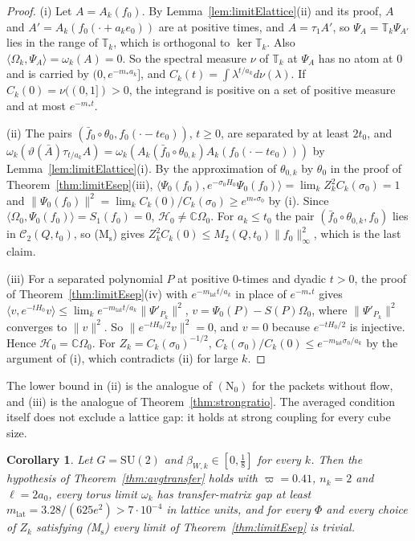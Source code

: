 \documentclass[aps,prd,twocolumn,superscriptaddress,nofootinbib,longbibliography,floatfix,amsmath,amssymb,10pt]{revtex4-2}
\newtheorem{corollary}[theorem]{Corollary}
\theoremstyle{definition}
\theoremstyle{remark}
\newcommand{\C}{\mathbb{C}}
\newcommand{\SU}{\mathrm{SU}}
\newcommand{\ip}[2]{\langle #1,#2\rangle}
\begin{document}
\begin{proof}
(i) Let $A=A_k(f_0)$. By Lemma~\ref{lem:limitElattice}(ii) and its proof,
$A$ and $A'=A_k(f_0(\cdot+a_ke_0))$ are at positive times, and $A=\tau_1A'$,
so $\Psi_A=\mathbb T_k\Psi_{A'}$ lies in the range of $\mathbb T_k$, which is
orthogonal to $\ker\mathbb T_k$. Also $\ip{\Omega_k}{\Psi_A}=\omega_k(A)=0$.
So the spectral measure $\nu$ of $\mathbb T_k$ at $\Psi_A$ has no atom at
$0$ and is carried by $(0,e^{-m_*a_k}]$, and $C_k(t)=\int\lambda^{t/a_k}
d\nu(\lambda)$. If $C_k(0)=\nu((0,1])>0$, the integrand is positive on a
set of positive measure and at most $e^{-m_*t}$.

(ii) The pairs $(\bar f_0\circ\theta_0,f_0(\cdot-te_0))$, $t\ge0$, are
separated by at least $2t_0$, and $\omega_k(\vartheta(\bar A)\tau_{t/a_k}
A)=\omega_k(A_k(\bar f_0\circ\theta_{0,k})A_k(f_0(\cdot-te_0)))$ by
Lemma~\ref{lem:limitElattice}(i). By the approximation of $\theta_{0,k}$ by
$\theta_0$ in the proof of Theorem~\ref{thm:limitEsep}(iii),
$\ip{\Psi_0(f_0)}{e^{-\sigma_0H_0}\Psi_0(f_0)}=\lim_kZ_k^2C_k(\sigma_0)=1$
and $\|\Psi_0(f_0)\|^2=\lim_kC_k(0)/C_k(\sigma_0)\ge e^{m_*\sigma_0}$ by (i).
Since $\ip{\Omega_0}{\Psi_0(f_0)}=S_1(f_0)=0$, $\mathcal H_0\ne\C\Omega_0$.
For $a_k\le t_0$ the pair $(\bar f_0\circ\theta_{0,k},f_0)$ lies in
$\mathcal C_2(Q,t_0)$, so (M$_{\mathrm s}$) gives $Z_k^2C_k(0)\le M_2(Q,t_0)
\|f_0\|_\infty^2$, which is the last claim.

(iii) For a separated polynomial $P$ at positive $0$-times and dyadic $t>0$,
the proof of Theorem~\ref{thm:limitEsep}(iv) with $e^{-m_{\mathrm{lat}}t/a_k}$ in place
of $e^{-m_*t}$ gives $\ip v{e^{-tH_0}v}\le\lim_ke^{-m_{\mathrm{lat}}t/a_k}\|\Psi'_{P_k}
\|^2$, $v=\Psi_0(P)-S(P)\Omega_0$, where $\|\Psi'_{P_k}\|^2$ converges to
$\|v\|^2$. So $\|e^{-tH_0/2}v\|^2=0$, and $v=0$ because $e^{-tH_0/2}$ is
injective. Hence $\mathcal H_0=\C\Omega_0$. For $Z_k=C_k(\sigma_0)^{-1/2}$,
$C_k(\sigma_0)/C_k(0)\le e^{-m_{\mathrm{lat}}\sigma_0/a_k}$ by the argument of (i), which
contradicts (ii) for large $k$.
\end{proof}

The lower bound in (ii) is the analogue of $(\mathrm N_0)$ for the packets
without flow, and (iii) is the analogue of Theorem~\ref{thm:strongratio}.
The averaged condition itself does not exclude a lattice gap: it holds at
strong coupling for every cube size.

\begin{corollary}\label{cor:limitEstrong}
Let $G=\SU(2)$ and $\beta_{W,k}\in[0,\frac18]$ for every $k$. Then the
hypothesis of Theorem~\textup{\ref{thm:avgtransfer}} holds with
$\varpi=0.41$, $n_k=2$ and $\ell=2a_0$, every torus limit $\omega_k$ has
transfer-matrix gap at least $m_{\mathrm{lat}}=3.28/(625e^2)>7\cdot10^{-4}$ in lattice
units, and for every $\Phi$ and every choice of $Z_k$ satisfying
\textup{(M$_{\mathrm s}$)} every limit of
Theorem~\textup{\ref{thm:limitEsep}} is trivial.
\end{corollary}
\end{document}
